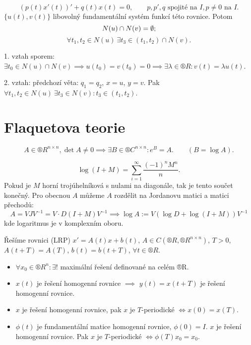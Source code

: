 \documentclass[12pt]{article}					%
\begin{document}
\begin{veta}[Šturnova]
	$$ (p(t)x'(t))' + q(t)x(t) = 0, \qquad p, p', q \text{ spojité na } I, p≠0 \text{ na } I. $$
	$\{u(t), v(t)\}$ libovolný fundamentální systém funkcí této rovnice. Potom
	$$ N(u) \cap N(v) = \emptyset; $$
	$$ \forall t_1, t_2 \in N(u)\ \exists t_3 \in (t_1, t_2) \cap N(v). $$

	\begin{dukazin}
		1. vztah sporem: $\exists t_0 \in N(u) \cap N(v) \implies u(t_0) = v(t_0) = 0 \implies \exists \lambda \in ®R: v(t) = \lambda u(t)$.

		2. vztah: předchozí věta: $q_1 = q_2$, $x = u$, $y  = v$. Pak $\forall t_1, t_2 \in N(u)\ \exists t_3 \in N(v): t_3 \in (t_1, t_2)$.
	\end{dukazin}
\end{veta}

\section{Flaquetova teorie}
\begin{lemma}
	$$ A \in ®R^{n \times n}, \det A ≠ 0 \implies \exists B \in ®C^{n \times n}: e^B = A. \qquad (B = \log A). $$

	\begin{dukazin}
		$$ \log(I + M) = \sum_{i=1}^∞ \frac{(-1)^n M^n}{n}. $$
		Pokud je $M$ horní trojúhelníková s nulami na diagonále, tak je tento součet konečný. Pro obecnou $A$ můžeme $A$ rozdělit na Jordanovu matici a matici přechodů:
		$$ A = VJV^{-1} = V·D(I + M)V^{-1} \implies \log A := V(\log D + \log(I + M))V^{-1} $$
		kde logaritmus je v komplexním oboru.
	\end{dukazin}
\end{lemma}


\begin{poznamka}
	Řešíme rovnici (LRP) $x' = A(t) x + b(t)$, $A \in C(®R, ®R^{n \times n})$, $T > 0$, $A(t + T) = A(T)$, $b(t) = b(t + T)$, $\forall t \in ®R$.
	\begin{itemize}
		\item $\forall x_0 \in ®R^n: \exists!$ maximální řešení definované na celém ®R.
		\item $x(t)$ je řešení homogenní rovnice $\implies$ $y(t) = x(t + T)$ je řešení homogenní rovnice.
		\item $x$ je řešení homogenní rovnice, pak $x$ je $T$-periodické $\Leftrightarrow x(0) = x(T)$.
		\item $\phi(t)$ je fundamentální matice homogenní rovnice, $\phi(0) = I$. $x$ je řešení homogenní rovnice. Pak $x$ je $T$-periodické $\Leftrightarrow \phi(T)x_0 = x_0$.
	\end{itemize}
\end{poznamka}
\end{document}
